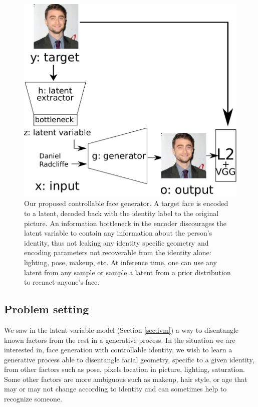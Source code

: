 \begin{figure}[ht]
    \centering
    \includegraphics[scale=0.75]{60-files/latent-facegen.pdf}
    \caption{Our proposed controllable face generator. A target face is encoded to a latent, decoded back with the identity label to the original picture. An information bottleneck in the encoder discourages the latent variable to contain any information about the person's identity, thus not leaking any identity specific geometry and encoding parameters not recoverable from the identity alone: lighting, pose, makeup, etc. At inference time, one can use any latent from any sample or sample a latent from a prior distribution to reenact anyone's face.}
    \label{fig:latent-facegen}
\end{figure}

\subsection{Problem setting}

We saw in the latent variable model (Section \ref{sec:lvm}) a way to disentangle known factors from the rest in a generative process. In the situation we are interested in, face generation with controllable identity, we wish to learn a generative process able to disentangle facial geometry, specific to a given identity, from other factors such as pose, pixels location in picture, lighting, saturation. Some other factors are more ambiguous such as makeup, hair style, or age that may or may not change according to identity and can sometimes help to recognize someone.

